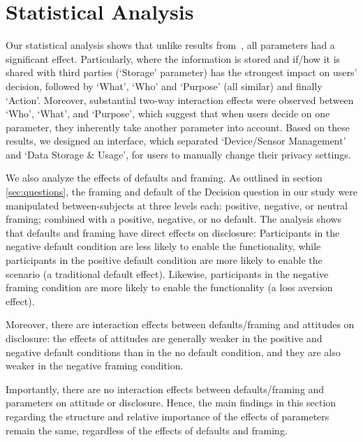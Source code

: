 \section{Statistical Analysis}\label{sec:statAlys2}
Our statistical analysis shows that unlike results from~\cite{bahiratiui2018}, all parameters had a significant effect. Particularly, where the information is stored and if/how it is shared with third parties (`Storage' parameter) has the strongest impact on users' decision, followed by `What', `Who' and `Purpose' (all similar) and finally `Action'. Moreover, substantial two-way interaction effects were observed between `Who', `What', and `Purpose', which suggest that when users decide on one parameter, they inherently take another parameter into account. Based on these results, we designed an interface, which separated `Device/Sensor Management' and `Data Storage \& Usage', for users to manually change their privacy settings. 

We also analyze the effects of defaults and framing. As outlined in section \ref{sec:questions}, the framing and default of the Decision question in our study were manipulated between-subjects at three levels each: positive, negative, or neutral framing; combined with a positive, negative, or no default. The analysis shows that defaults and framing have direct effects on disclosure: Participants in the negative default condition are less likely to enable the functionality, while participants in the positive default condition are more likely to enable the scenario (a traditional default effect). Likewise, participants in the negative framing condition are more likely to enable the functionality (a loss aversion effect).

Moreover, there are interaction effects between defaults/framing and attitudes on disclosure: the effects of attitudes are generally weaker in the positive and negative default conditions than in the no default condition, and they are also weaker in the negative framing condition.

Importantly, there are no interaction effects between defaults/framing and parameters on attitude or disclosure. Hence, the main findings in this section regarding the structure and relative importance of the effects of parameters remain the same, regardless of the effects of defaults and framing.

